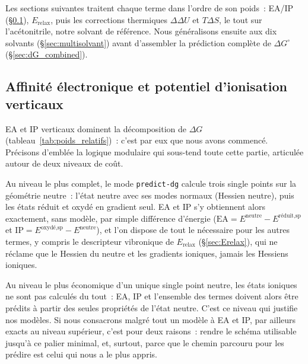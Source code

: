Les sections suivantes traitent chaque terme dans l'ordre de son poids~: EA/IP (§\ref{sec:EA_IP}), $E_{\text{relax}}$, puis les corrections thermiques $\Delta\Delta U$ et $T\Delta S$, le tout sur l'acétonitrile, notre solvant de référence. Nous généralisons ensuite aux dix solvants (§\ref{sec:multisolvant}) avant d'assembler la prédiction complète de $\Delta G^\circ$ (§\ref{sec:dG_combined}).

\subsection{Affinité électronique et potentiel d'ionisation verticaux}
\label{sec:EA_IP}

EA et IP verticaux dominent la décomposition de $\Delta G$ (tableau~\ref{tab:poids_relatifs})~: c'est par eux que nous avons commencé. Précisons d'emblée la logique modulaire qui sous-tend toute cette partie, articulée autour de deux niveaux de coût.

Au niveau le plus complet, le mode \texttt{predict-dg} calcule trois single points sur la géométrie neutre~: l'état neutre avec ses modes normaux (Hessien neutre), puis les états réduit et oxydé en gradient seul. EA et IP s'y obtiennent alors exactement, sans modèle, par simple différence d'énergie ($\text{EA} = E^{\text{neutre}} - E^{\text{réduit,sp}}$ et $\text{IP} = E^{\text{oxydé,sp}} - E^{\text{neutre}}$), et l'on dispose de tout le nécessaire pour les autres termes, y compris le descripteur vibronique de $E_{\text{relax}}$ (§\ref{sec:Erelax}), qui ne réclame que le Hessien du neutre et les gradients ioniques, jamais les Hessiens ioniques.

Au niveau le plus économique d'un unique single point neutre, les états ioniques ne sont pas calculés du tout~: EA, IP et l'ensemble des termes doivent alors être prédits à partir des seules propriétés de l'état neutre. C'est ce niveau qui justifie nos modèles. Si nous consacrons malgré tout un modèle à EA et IP, par ailleurs exacts au niveau supérieur, c'est pour deux raisons~: rendre le schéma utilisable jusqu'à ce palier minimal, et, surtout, parce que le chemin parcouru pour les prédire est celui qui nous a le plus appris.

